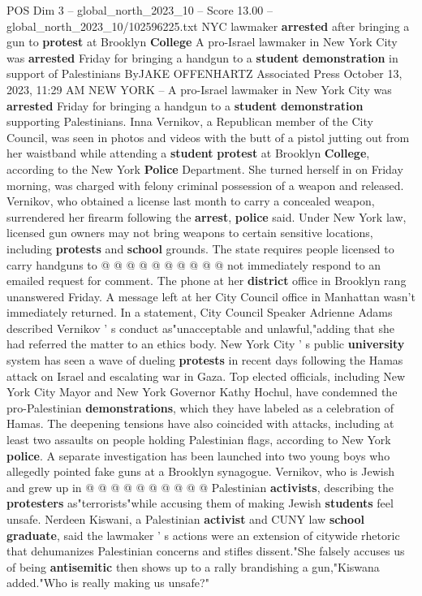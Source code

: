 \begin{textsample}{POS Dim 3 – global\_north\_2023\_10 – Score 13.00 – global\_north\_2023\_10/102596225.txt}  \label{ex:f3_pos_273}
NYC lawmaker \textbf{arrested} after bringing a gun to \textbf{protest} at Brooklyn \textbf{College} A pro-Israel lawmaker in New York City was \textbf{arrested} Friday for bringing a handgun to a \textbf{student} \textbf{demonstration} in support of Palestinians ByJAKE OFFENHARTZ Associated Press October 13, 2023, 11:29 AM NEW YORK -- A pro-Israel lawmaker in New York City was \textbf{arrested} Friday for bringing a handgun to a \textbf{student} \textbf{demonstration} supporting Palestinians.
Inna Vernikov, a Republican member of the City Council, was seen in photos and videos with the butt of a pistol jutting out from her waistband while attending a \textbf{student} \textbf{protest} at Brooklyn \textbf{College}, according to the New York \textbf{Police} Department.
She turned herself in on Friday morning, was charged with felony criminal possession of a weapon and released.
Vernikov, who obtained a license last month to carry a concealed weapon, surrendered her firearm following the \textbf{arrest}, \textbf{police} said.
Under New York law, licensed gun owners may not bring weapons to certain sensitive locations, including \textbf{protests} and \textbf{school} grounds.
The state requires people licensed to carry handguns to @ @ @ @ @ @ @ @ @ @ not immediately respond to an emailed request for comment.
The phone at her \textbf{district} office in Brooklyn rang unanswered Friday.
A message left at her City Council office in Manhattan wasn't immediately returned.
In a statement, City Council Speaker Adrienne Adams described Vernikov ' s conduct as"unacceptable and unlawful,"adding that she had referred the matter to an ethics body.
New York City ' s public \textbf{university} system has seen a wave of dueling \textbf{protests} in recent days following the Hamas attack on Israel and escalating war in Gaza.
Top elected officials, including New York City Mayor and New York Governor Kathy Hochul, have condemned the pro-Palestinian \textbf{demonstrations}, which they have labeled as a celebration of Hamas.
The deepening tensions have also coincided with attacks, including at least two assaults on people holding Palestinian flags, according to New York \textbf{police}.
A separate investigation has been launched into two young boys who allegedly pointed fake guns at a Brooklyn synagogue.
Vernikov, who is Jewish and grew up in @ @ @ @ @ @ @ @ @ @ Palestinian \textbf{activists}, describing the \textbf{protesters} as"terrorists"while accusing them of making Jewish \textbf{students} feel unsafe.
Nerdeen Kiswani, a Palestinian \textbf{activist} and CUNY law \textbf{school} \textbf{graduate}, said the lawmaker ' s actions were an extension of citywide rhetoric that dehumanizes Palestinian concerns and stifles dissent."She falsely accuses us of being \textbf{antisemitic} then shows up to a rally brandishing a gun,"Kiswana added."Who is really making us unsafe?"

\end{textsample}
